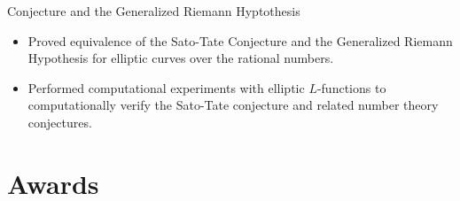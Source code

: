 \documentclass{article}
\begin{document}
\begin{itemize}
{      Conjecture and the Generalized Riemann
      Hyptothesis} %
   \begin{itemize}
   \item Proved equivalence of the Sato-Tate Conjecture and the Generalized
     Riemann Hypothesis for elliptic curves over the rational numbers.
   \item Performed computational experiments with elliptic $L$-functions to
     computationally verify the Sato-Tate conjecture and related number theory
     conjectures.
   \end{itemize}
\end{itemize}




\section*{Awards}
\end{document}
